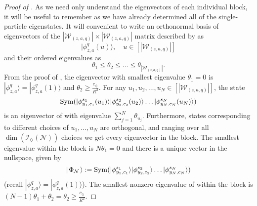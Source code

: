 \documentclass[../thesis-main/thesis-main]{subfiles}
\begin{document}
\begin{proof}[Proof of \protect{}]
As we need only understand the eigenvectors of each individual block, it will be useful to remember  as we have already determined all of the single-particle eigenstates.  It will convenient to write an orthonormal basis of eigenvectors of the $|\mathcal{W}_{(z,a,q)}|\times|\mathcal{W}_{(z,a,q)}|$ matrix described by  as 
\begin{equation}
|\phi_{z,a}^{q}(u)\rangle, \quad u\in[|\mathcal{W}_{(z,a,q)}|]\label{eq:phi_u}
\end{equation}
and their ordered eigenvalues as
\begin{equation}
\theta_{1}\leq\theta_{2}\leq\ldots\leq\theta_{|\mathcal{W}_{(z,a,q)}|}.
\end{equation}
From the proof of , the eigenvector with smallest eigenvalue $\theta_{1}=0$ is $|\phi_{z,a}^{q}\rangle=|\phi_{z,a}^{q}(1)\rangle$ and $\theta_{2}\geq\frac{c_{\diamondsuit}}{R^{2}}$. For any $u_{1},u_{2},\ldots,u_{N}\in [|\mathcal{W}_{(z,a,q)}|]$, the state 
\begin{equation}
\operatorname{Sym}(|\phi_{y_{1},c_{1}}^{s_{1}}(u_{1})\rangle|\phi_{y_{2},c_{2}}^{s_{2}}(u_{2})\rangle\ldots|\phi_{y_{N},c_{N}}^{s_{N}}(u_{N})\rangle)
\end{equation}
is an eigenvector of  with eigenvalue $\sum_{j=1}^{N}\theta_{u_j}.$ Furthermore, states corresponding to different choices of $u_{1},\ldots,u_{N}$ are orthogonal, and ranging over all $\dim(\mathcal{I}_{\diamondsuit}(\mathcal{N}))$ choices we get every eigenvector in the block. The smallest eigenvalue within the block is $N\theta_{1}=0$ and there is a unique vector in the nullspace, given by
\begin{equation}
  |\mspace{2mu} \Phi_\mathcal{N} \mspace{2mu} \rangle := \operatorname{Sym}(|\phi_{y_{1},c_{1}}^{s_{1}}\rangle|\phi_{y_{2},c_{2}}^{s_{2}}\rangle\ldots|\phi_{y_{N},c_{N}}^{s_{N}}\rangle)\label{eq:vector_type1}
\end{equation}
(recall $|\phi_{z,a}^{q}\rangle=|\phi_{z,a}^{q}(1)\rangle$). The smallest nonzero eigenvalue of  within the block is $(N-1)\theta_{1}+\theta_{2}=\theta_{2}\geq\frac{c_{\diamondsuit}}{R^{2}}$.


\end{proof}
\end{document}
